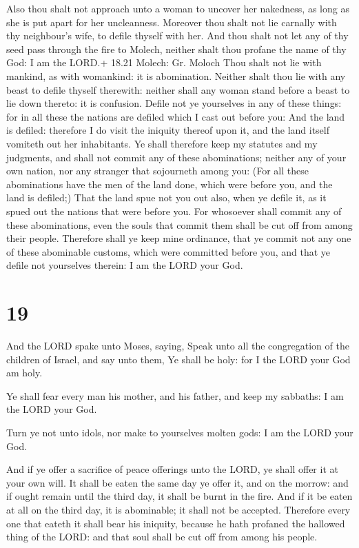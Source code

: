  Also thou shalt not approach unto a woman to uncover her
nakedness, as long as she is put apart for her uncleanness.
 Moreover thou shalt not lie carnally with thy neighbour's
wife, to defile thyself with her.  And thou shalt not let
any of thy seed pass through the fire to Molech, neither shalt thou
profane the name of thy God: I am the LORD.+ 18.21 Molech: Gr. Moloch
 Thou shalt not lie with mankind, as with womankind: it is
abomination.  Neither shalt thou lie with any beast to
defile thyself therewith: neither shall any woman stand before a beast
to lie down thereto: it is confusion.  Defile not ye
yourselves in any of these things: for in all these the nations are
defiled which I cast out before you:  And the land is
defiled: therefore I do visit the iniquity thereof upon it, and the land
itself vomiteth out her inhabitants.  Ye shall therefore
keep my statutes and my judgments, and shall not commit any of these
abominations; neither any of your own nation, nor any stranger that
sojourneth among you:  (For all these abominations have the
men of the land done, which were before you, and the land is defiled;)
 That the land spue not you out also, when ye defile it, as
it spued out the nations that were before you.  For
whosoever shall commit any of these abominations, even the souls that
commit them shall be cut off from among their people. 
Therefore shall ye keep mine ordinance, that ye commit not any one of
these abominable customs, which were committed before you, and that ye
defile not yourselves therein: I am the LORD your God.

\hypertarget{section-18}{%
\section{19}\label{section-18}}

 And the LORD spake unto Moses, saying,  Speak
unto all the congregation of the children of Israel, and say unto them,
Ye shall be holy: for I the LORD your God am holy.

 Ye shall fear every man his mother, and his father, and
keep my sabbaths: I am the LORD your God.

 Turn ye not unto idols, nor make to yourselves molten
gods: I am the LORD your God.

 And if ye offer a sacrifice of peace offerings unto the
LORD, ye shall offer it at your own will.  It shall be eaten
the same day ye offer it, and on the morrow: and if ought remain until
the third day, it shall be burnt in the fire.  And if it be
eaten at all on the third day, it is abominable; it shall not be
accepted.  Therefore every one that eateth it shall bear his
iniquity, because he hath profaned the hallowed thing of the LORD: and
that soul shall be cut off from among his people.

